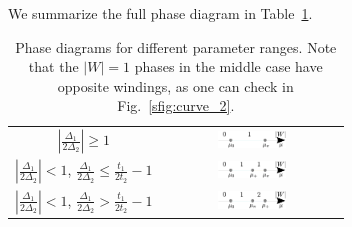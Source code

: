 \documentclass[a4paper]{article}
\begin{document}
We summarize the full phase diagram in Table~\ref{tab:phase_diagram}.

\begin{table}
	\centering
	\begin{tabular}{c|c}
		$\left|\frac{\Delta_1}{2\Delta_2}\right|\geq 1$ &
		\includegraphics[width=0.4\textwidth]{Figures/phase_diagram_1.pdf} \\
		$\left|\frac{\Delta_1}{2\Delta_2}\right|<1$,
		$\frac{\Delta_1}{2\Delta_2} \leq \frac{t_1}{2t_2} - 1$ &
		\includegraphics[width=0.4\textwidth]{Figures/phase_diagram_2.pdf} \\
		$\left|\frac{\Delta_1}{2\Delta_2}\right|<1$,
		$\frac{\Delta_1}{2\Delta_2} > \frac{t_1}{2t_2} - 1$ &
		\includegraphics[width=0.4\textwidth]{Figures/phase_diagram_3.pdf} \\
	\end{tabular}
	\caption{Phase diagrams for different parameter ranges. Note that the $|W|=1$ phases in the middle case have opposite windings, as one can check in Fig.~\ref{sfig:curve_2}.}
	\label{tab:phase_diagram}
\end{table}



\end{document}
